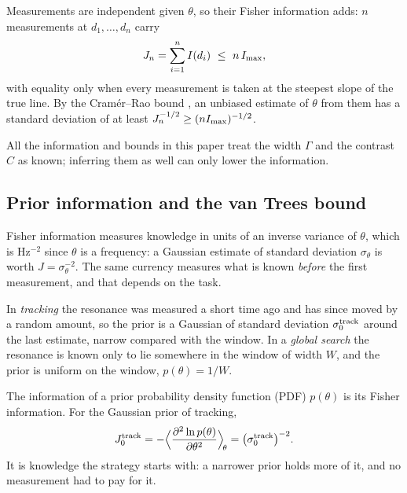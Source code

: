 Measurements are independent given $\theta$, so their Fisher information adds: $n$ measurements at
$d_1,\dots,d_n$ carry
\begin{equation*}
  J_n=\sum_{i=1}^{n}I(d_i)\ \le\ n\,I_{\rm max},
\end{equation*}
with equality only when every measurement is taken at the steepest slope of the true line. By the Cram\'er--Rao
bound \cite{cramer1946}, an unbiased estimate of $\theta$ from them has a standard deviation of at least
$J_n^{-1/2}\ge(nI_{\rm max})^{-1/2}$.

All the information and bounds in this paper treat the width $\Gamma$ and the contrast $C$ as known; inferring them as
well can only lower the information.

\subsection{Prior information and the van Trees bound}
\label{sec:prior}
\label{sec:budget}

Fisher information measures knowledge in units of an inverse variance of $\theta$, which is Hz$^{-2}$ since $\theta$
is a frequency: a Gaussian estimate of standard deviation $\sigma_\theta$ is worth $J=\sigma_\theta^{-2}$. The same
currency measures what is known \emph{before} the first measurement, and that depends on the task.

In \emph{tracking} the resonance was measured a short time ago and has since moved by a random amount, so the prior
is a Gaussian of standard deviation $\sigma_0^{\rm track}$ around the last estimate, narrow compared with the window. In a
\emph{global search} the resonance is known only to lie somewhere in the window of width $W$, and the prior is
uniform on the window, $p(\theta)=1/W$.

The information of a prior probability density function (PDF) $p(\theta)$ is its Fisher information. For the
Gaussian prior of tracking,
\begin{equation}
  J_0^{\rm track}=-\Big\langle\frac{\partial^2\ln p(\theta)}{\partial\theta^2}\Big\rangle_{\!\theta}=\big(\sigma_0^{\rm track}\big)^{-2}.
  \label{eq:j0}
\end{equation}
It is knowledge the strategy starts with: a narrower prior holds more of it, and no measurement had to pay for it.

